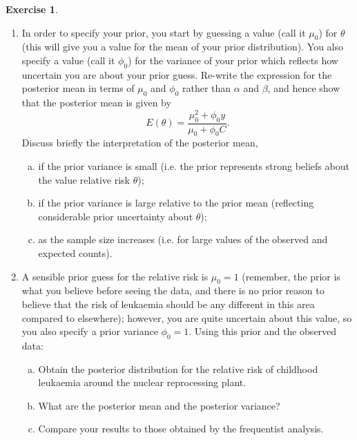 \documentclass{article}
\theoremstyle{plain}
\theoremstyle{definition}
\newtheorem{exercise}{Exercise}
\begin{document}
\begin{exercise}
\begin{enumerate}
\item In order to specify your prior, you start by guessing a value (call it $\mu_0$) for $\theta$ (this will give you a value for the mean of your prior distribution). You also specify a value (call it $\phi_0$) for the variance of your prior which reflects how uncertain you are about your prior guess. Re-write the expression for the posterior mean in terms of $\mu_0$ and $\phi_0$ rather than $\alpha$ and $\beta$, and hence show that the posterior mean is given by
\[
E(\theta) =\frac{\mu^2_0 + \phi_0y}{\mu_0 + \phi_0C}.
\]
Discuss briefly the interpretation of the posterior mean,
\begin{enumerate}[(a)]
\item if the prior variance is small (i.e. the prior represents strong beliefs about the value relative risk $\theta$);
\item if the prior variance is large relative to the prior mean (reflecting
considerable prior uncertainty about $\theta$);
\item as the sample size increases (i.e. for large values of the observed
and expected counts).
\end{enumerate}
\item A sensible prior guess for the relative risk is $\mu_0 = 1$ (remember, the prior is what you believe before seeing the data, and there is no prior
reason to believe that the risk of leukaemia should be any different in this area compared to elsewhere); however, you are quite uncertain about this value, so you also specify a prior variance $\phi_0 = 1$. Using this
prior and the observed data:
\begin{enumerate}[(a)]
\item Obtain the posterior distribution for the relative risk of childhood
leukaemia around the nuclear reprocessing plant.
\item What are the posterior mean and the posterior variance?
\item Compare your results to those obtained by the frequentist analysis.
\end{enumerate}

\end{enumerate}

\end{exercise}
\end{document}
